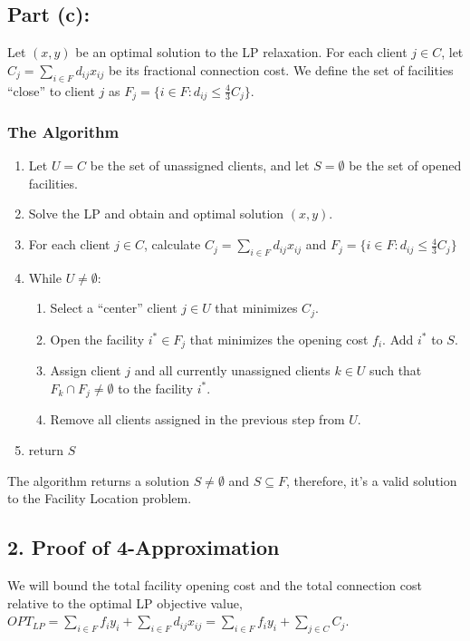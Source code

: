 \newpage
\subsection*{Part (c):}

Let $(x, y)$ be an optimal solution to the LP relaxation. For each client $j \in C$, let $C_j = \sum_{i \in F} d_{ij} x_{ij}$ be its fractional connection cost. We define the set of facilities ``close'' to client $j$ as $F_j = \{ i \in F : d_{ij} \le \frac{4}{3} C_j \}$.

\subsubsection*{The Algorithm}
\begin{enumerate}
    \item Let $U = C$ be the set of unassigned clients, and let $S = 
    \emptyset$ be the set of opened facilities.
    \item Solve the LP and obtain and optimal solution $(x,y)$.
    \item For each client $j \in C$, calculate $C_j = \sum_{i \in F} d_{ij} x_{ij}$ and $F_j = \{ i \in F : d_{ij} \le \frac{4}{3} C_j \}$
    \item While $U \neq \emptyset$:
    \begin{enumerate}
        \item Select a ``center'' client $j \in U$ that minimizes $C_j$.
        \item Open the facility $i^* \in F_j$ that minimizes the opening cost $f_i$. Add $i^*$ to $S$.
        \item Assign client $j$ and all currently unassigned clients $k \in U$ such that $F_k \cap F_j \neq \emptyset$ to the facility $i^*$. 
        \item Remove all clients assigned in the previous step from $U$.
    \end{enumerate}
    \item return $S$
\end{enumerate}

The algorithm returns a solution $S \neq \emptyset$ and $S \subseteq F$, therefore, it's a valid solution to the Facility Location problem.


\subsection*{2. Proof of 4-Approximation}

We will bound the total facility opening cost and the total connection cost relative to the optimal LP objective value, $OPT_{LP} = \sum_{i \in F} f_i y_i + \sum_{i \in F} d_{ij} x_{ij}=  \sum_{i \in F} f_i y_i + \sum_{j \in C} C_j$.

